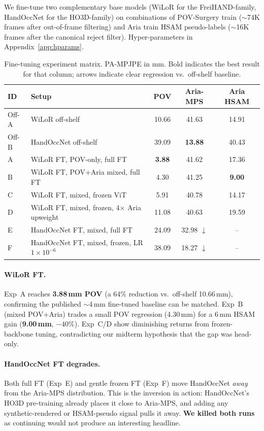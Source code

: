 \documentclass{article}
\begin{document}
We fine-tune two complementary base models (WiLoR for the FreiHAND-family, HandOccNet for the HO3D-family) on combinations of POV-Surgery train ($\sim$74K frames after out-of-frame filtering) and Aria train HSAM pseudo-labels ($\sim$16K frames after the canonical reject filter). Hyper-parameters in Appendix~\ref{app:hparams}.

\begin{table}[h]
\centering
\small
\caption{Fine-tuning experiment matrix. PA-MPJPE in mm. Bold indicates the best result for that column; arrows indicate clear regression vs.\ off-shelf baseline.}
\label{tab:ft_matrix}
\begin{tabular}{llccc}
\toprule
\textbf{ID} & \textbf{Setup} & \textbf{POV} & \textbf{Aria-MPS} & \textbf{Aria HSAM} \\
\midrule
Off-A & WiLoR off-shelf & 10.66 & 41.63 & 14.91 \\
Off-B & HandOccNet off-shelf & 39.09 & \textbf{13.88} & 40.43 \\
\midrule
A & WiLoR FT, POV-only, full FT  & \textbf{3.88} & 41.62 & 17.36 \\
B & WiLoR FT, POV+Aria mixed, full FT & 4.30 & 41.25 & \textbf{9.00} \\
C & WiLoR FT, mixed, frozen ViT & 5.91 & 40.78 & 14.17 \\
D & WiLoR FT, mixed, frozen, 4$\times$ Aria upweight & 11.08 & 40.63 & 19.59 \\
E & HandOccNet FT, mixed, full FT & 24.09 & 32.98 $\downarrow$ & --   \\
F & HandOccNet FT, mixed, frozen, LR $1\!\times\!10^{-6}$ & 38.09 & 18.27 $\downarrow$ & --   \\
\bottomrule
\end{tabular}
\end{table}

\paragraph{WiLoR FT.}
Exp~A reaches \textbf{3.88\,mm POV} (a 64\% reduction vs.\ off-shelf 10.66\,mm), confirming the published $\sim$4\,mm fine-tuned baseline can be matched. Exp~B (mixed POV+Aria) trades a small POV regression (4.30\,mm) for a 6\,mm HSAM gain (\textbf{9.00\,mm}, $-40\%$). Exp~C/D show diminishing returns from frozen-backbone tuning, contradicting our midterm hypothesis that the gap was head-only.

\paragraph{HandOccNet FT degrades.}
Both full FT (Exp~E) and gentle frozen FT (Exp~F) move HandOccNet \emph{away} from the Aria-MPS distribution. This is the inversion in action: HandOccNet's HO3D pre-training already places it close to Aria-MPS, and adding any synthetic-rendered or HSAM-pseudo signal pulls it away. \textbf{We killed both runs} as continuing would not produce an interesting headline.
\end{document}
